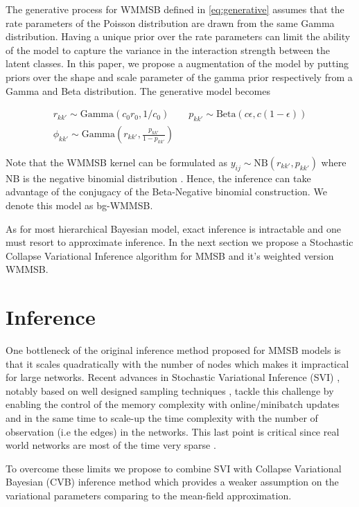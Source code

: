The generative process for WMMSB defined in \eqref{eq:generative} assumes that the rate parameters of the Poisson distribution are drawn from the same Gamma distribution. Having a unique prior over the rate parameters can limit the ability of the model to capture the variance in the interaction strength between the latent classes. In this paper, we propose a augmentation of the model by putting priors over the shape and scale parameter of the gamma prior respectively from a Gamma and Beta distribution. The generative model becomes

\begin{gather*}
r_{kk'} \sim \textrm{Gamma}(c_0r_0, 1/c_0) \qquad p_{kk'} \sim \textrm{Beta}(c\epsilon, c(1-\epsilon)) \\
\phi_{kk'} \sim \textrm{Gamma}(r_{kk'}, \frac{p_{kk'}}{1-p_{kk'}})
\end{gather*}

Note that the WMMSB kernel can be formulated as $y_{ij} \sim \textrm{NB}(r_{kk'}, p_{kk'})$ where NB is the negative binomial distribution \cite{zhou2015negative} \cite{zhou2012beta}. Hence, the inference can take advantage of the conjugacy of the Beta-Negative binomial construction. We denote this model as bg-WMMSB.

As for most hierarchical Bayesian model, exact inference is intractable and one must resort to approximate inference. In the next section we propose a Stochastic Collapse Variational Inference algorithm for MMSB and it's weighted version WMMSB.


\section{Inference}

One bottleneck of the original inference method proposed for MMSB models is that it scales quadratically with the number of nodes which makes it impractical for large networks. Recent advances in Stochastic Variational Inference (SVI) \cite{hoffman2013stochastic}, notably based on well designed sampling techniques \cite{gopalan2013efficient}\cite{kim2013efficient}, tackle this challenge by enabling the control of the memory complexity with online/minibatch updates and in the same time to scale-up the time complexity with the number of observation (i.e the edges) in the networks. This last point is critical since real world networks are most of the time very sparse \cite{barabasi_burst}. 

To overcome these limits we propose to combine SVI with Collapse Variational Bayesian (CVB) inference method \cite{teh2006collapsed} which provides a weaker assumption on the variational parameters comparing to the mean-field approximation.



